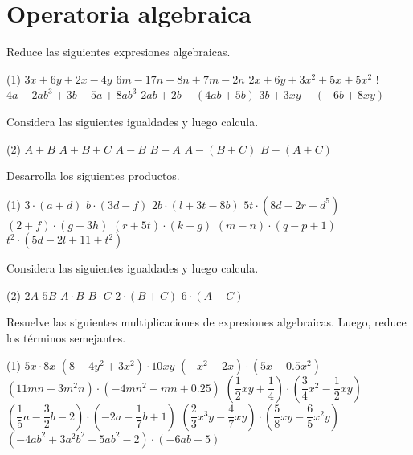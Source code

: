 \documentclass[options]{plantilla-material-v1}
\begin{document}
\section{Operatoria algebraica}

Reduce las siguientes expresiones algebraicas.
\begin{ejercicios}[resume](1)
  \ejercicio $3x +6y +2x -4y$
  \ejercicio $6m -17n +8n +7m -2n$
  \ejercicio $2x +6y +3x^2 +5x +5x^2$
  \ejercicio! $4a -2ab^3 +3b +5a +8ab^3$
  \ejercicio $2ab + 2b -(4ab+5b)$
  \ejercicio $3b + 3xy -(-6b+8xy)$
\end{ejercicios}

Considera las siguientes igualdades y luego calcula.
\begin{ejercicios}[resume](2)
  \ejercicio $A+B$
  \ejercicio $A+B+C$
  \ejercicio $A-B$
  \ejercicio $B-A$
  \ejercicio $A-(B+C)$
  \ejercicio $B-(A+C)$
\end{ejercicios}

Desarrolla los siguientes productos.
\begin{ejercicios}[resume](1)
  \ejercicio $3\cdot(a+d)$
  \ejercicio $b\cdot(3d-f)$
  \ejercicio $2b\cdot(l+3t-8b)$
  \ejercicio $5t\cdot(8d-2r+d^5)$
  \ejercicio $(2+f)\cdot(g+3h)$
  \ejercicio $(r+5t)\cdot(k-g)$
  \ejercicio $(m-n)\cdot(q-p+1)$
  \ejercicio $t^2\cdot(5d-2l+11+t^2)$
\end{ejercicios}

Considera las siguientes igualdades y luego calcula.
\begin{ejercicios}[resume](2)
  \ejercicio $2A$
  \ejercicio $5B$
  \ejercicio $A\cdot B$
  \ejercicio $B\cdot C$
  \ejercicio $2\cdot(B+C)$
  \ejercicio $6\cdot(A-C)$
\end{ejercicios}

Resuelve las siguientes multiplicaciones de expresiones algebraicas. Luego, reduce los
términos semejantes.

\begin{ejercicios}[resume](1)
  \ejercicio $5x\cdot8x$
  \ejercicio $(8-4y^2+3x^2)\cdot 10xy$
  \ejercicio $(-x^2+2x)\cdot(5x-0.5x^2)$
  \ejercicio $(11mn+3m^2n)\cdot(-4mn^2-mn+0.25)$
  \ejercicio $\left(\dfrac{1}{2}xy+\dfrac{1}{4}\right)\cdot
    \left(\dfrac{3}{4}x^2-\dfrac{1}{2}xy\right)$
  \ejercicio $\left(\dfrac{1}{5}a-\dfrac{3}{2}b-2\right)\cdot
    \left(-2a-\dfrac{1}{7}b+1\right)$
  \ejercicio $\left(\dfrac{2}{3}x^3y-\dfrac{4}{7}xy\right)\cdot
    \left(\dfrac{5}{8}xy-\dfrac{6}{5}x^2y\right)$
  \ejercicio $(-4ab^2+3a^2b^2-5ab^2-2)\cdot(-6ab+5)$
\end{ejercicios}
\end{document}
